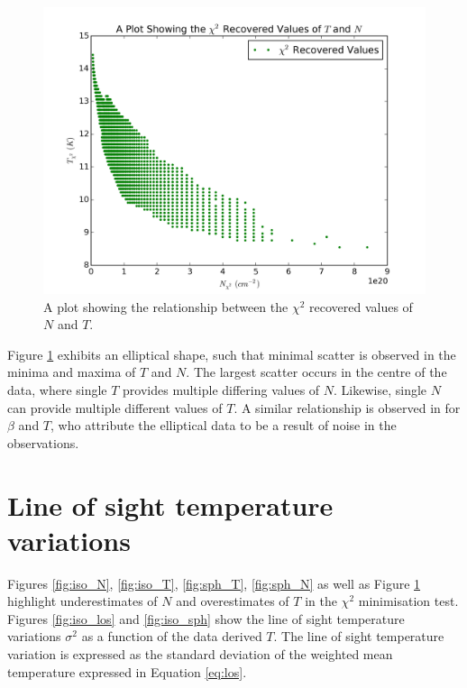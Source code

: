 \documentclass{report}
\begin{document}
\begin{figure}[H]
  \centering
  \includegraphics[width=0.5\linewidth]{../img/sph/contours.png}
  \caption{A plot showing the relationship between the $\chi^{2}$ recovered values of $N$ and $T$.}\label{fig:contours}
\end{figure}

Figure \ref{fig:contours} exhibits an elliptical shape, such that minimal scatter is observed in the minima and maxima of $T$ and $N$. The largest scatter occurs in the centre of the data, where single $T$ provides multiple differing values of $N$. Likewise, single $N$ can provide multiple different values of $T$. A similar relationship is observed in \textcite{noise,noiseb} for $\beta$ and $T$, who attribute the elliptical data to be a result of noise in the observations.

\section{Line of sight temperature variations}
Figures \ref{fig:iso_N}, \ref{fig:iso_T},  \ref{fig:sph_T}, \ref{fig:sph_N} as well as Figure \ref{fig:contours} highlight underestimates of $N$ and overestimates of $T$ in the $\chi^{2}$ minimisation test. Figures \ref{fig:iso_los} and
\ref{fig:iso_sph} show the line of sight temperature variations $\sigma^{2}$ as a function of the data derived $T$. The line of sight temperature variation is expressed as the standard deviation of the weighted mean temperature expressed in Equation \ref{eq:los}.
\end{document}
